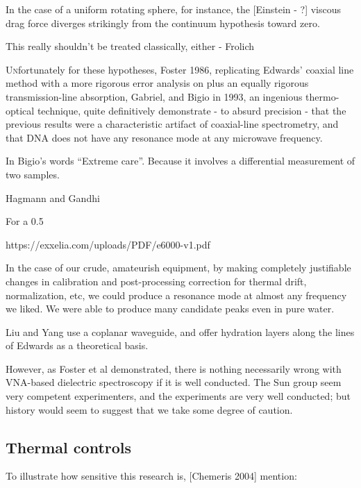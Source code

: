 \documentclass[paper.tex]{subfiles}
\begin{document}
\begin{multicols}{1}
In the case of a uniform rotating sphere, for instance, the [Einstein - ?] viscous drag force diverges strikingly from the continuum hypothesis toward zero.

This really shouldn’t be treated classically, either - Frolich 

\lettrine{U}nfortunately for these hypotheses, Foster 1986, replicating Edwards’ coaxial line method with a more rigorous error analysis on plus an equally rigorous transmission-line absorption, Gabriel, and Bigio in 1993, an ingenious thermo-optical technique, quite definitively demonstrate - to absurd precision -  that the previous results were a characteristic artifact of coaxial-line spectrometry, and that DNA does not have any resonance mode at any microwave frequency.

In Bigio’s words “Extreme care”. Because it involves a differential measurement of two samples.

Hagmann and Gandhi \cite{Substitution1982}



For a 0.5%

https://exxelia.com/uploads/PDF/e6000-v1.pdf


In the case of our crude, amateurish equipment, by making completely justifiable changes in calibration and post-processing correction for thermal drift, normalization, etc, we could produce a resonance mode at almost any frequency we liked. We were able to produce many candidate peaks even in pure water.


Liu and Yang use a coplanar waveguide, and offer hydration layers along the lines of Edwards as a theoretical basis.




However, as Foster et al demonstrated, there is nothing necessarily wrong with VNA-based dielectric spectroscopy if it is well conducted. The Sun group seem very competent experimenters, and the experiments are very well conducted; but history would seem to suggest that we take some degree of caution.




\subsection{Thermal controls}

To illustrate how sensitive this research is, [Chemeris 2004] mention:


\end{multicols}
\end{document}
